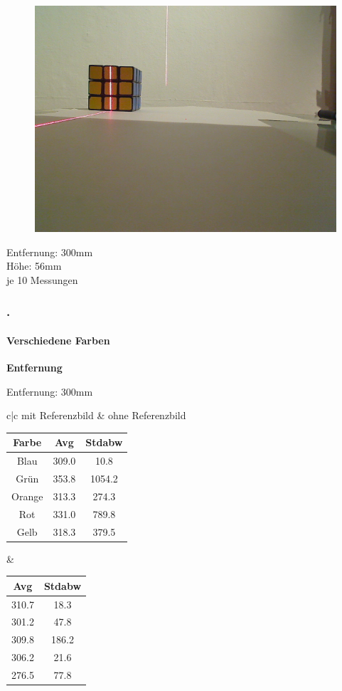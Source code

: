 \documentclass[xcolor=dvipsnames]{beamer}
\def\frametitlesec{\frametitle{\arabic{section}.\hspace{0.5ex}\insertsection}}
\def\framesubtitles#1{\framesubtitle{\hspace{3.5ex}#1}}
\begin{document}
\begin{frame}
\begin{figure}
\begin{minipage}{0.32\linewidth}
			\includegraphics[width=\linewidth]{includes/test_color_3}
		\end{minipage}
	\end{figure}

	Entfernung: 300mm\\
	Höhe: 56mm\\
	je 10 Messungen

\end{frame}


\begin{frame}
	\frametitlesec
	\framesubtitles{Verschiedene Farben}

	\textbf{Entfernung}

	Entfernung: 300mm
	\vfill

	\begin{tabular}{c|c}
		mit Referenzbild & ohne Referenzbild\\
		\begin{tabular}{c|c|c}
			Farbe  & Avg & Stdabw\\ \hline
			Blau   & 309.0 & 10.8\\
			Grün   & 353.8 & 1054.2\\
			Orange & 313.3 & 274.3\\
			Rot    & 331.0 & 789.8\\
			Gelb   & 318.3 & 379.5
		\end{tabular} &

		\begin{tabular}{c|c}
			Avg & Stdabw\\ \hline
			310.7 & 18.3\\
			301.2 & 47.8\\
			309.8 & 186.2\\
			306.2 & 21.6\\
			276.5 & 77.8
		\end{tabular}
	\end{tabular}

\end{frame}
\end{document}
